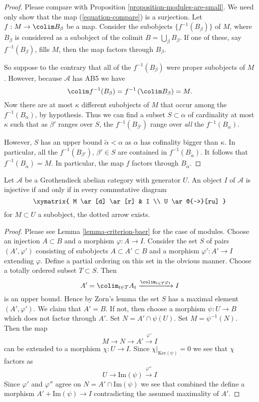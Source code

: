 \begin{proof}
Please compare with Proposition \ref{proposition-modules-are-small}.
We need only show that the map (\ref{equation-compare}) is a surjection.
Let $f : M \to \colim B_\beta$ be a map.
Consider the subobjects $\{f^{-1}(B_\beta)\}$ of $M$, where $B_\beta$
is considered as a subobject of the colimit $B = \bigcup_\beta B_\beta$.
If one of these, say $f^{-1}(B_\beta)$, fills $M$,
then the map factors through $B_\beta$.

\medskip\noindent
So suppose to the contrary that all of the $f^{-1}(B_\beta)$ were proper
subobjects of $M$. However, because $\mathcal{A}$ has
AB5 we have
$$
\colim f^{-1}(B_\beta) = f^{-1}\left(\colim B_\beta\right) = M.
$$
Now there are at most $\kappa$ different subobjects of $M$ that occur among
the $f^{-1}(B_\alpha)$, by hypothesis.
Thus we can find a subset $S \subset \alpha$ of cardinality at most
$\kappa$ such that as $\beta'$ ranges over $S$, the
$f^{-1}(B_{\beta'})$ range over \emph{all} the $f^{-1}(B_\alpha)$.

\medskip\noindent
However, $S$ has an upper bound $\widetilde{\alpha} < \alpha$ as
$\alpha$ has cofinality bigger than $\kappa$. In particular, all the
$f^{-1}(B_{\beta'})$, $\beta' \in S$ are contained in
$f^{-1}(B_{\widetilde{\alpha}})$.
It follows that $f^{-1}(B_{\widetilde{\alpha}}) = M$.
In particular, the map $f$ factors through $B_{\widetilde{\alpha}}$.
\end{proof}

\begin{lemma}
\label{lemma-characterize-injective}
Let $\mathcal{A}$ be a Grothendieck abelian category with generator $U$.
An object $I$ of $\mathcal{A}$ is injective if and only if in every
commutative diagram
$$
\xymatrix{
M \ar[d] \ar[r] &  I \\
U \ar@{-->}[ru]
}
$$
for $M \subset U$ a subobject, the dotted arrow exists.
\end{lemma}

\begin{proof}
Please see Lemma \ref{lemma-criterion-baer} for the case of modules.
Choose an injection $A \subset B$ and a morphism $\varphi : A \to I$.
Consider the set $S$ of pairs $(A', \varphi')$ consisting of
subobjects $A \subset A' \subset B$ and a morphism $\varphi' : A' \to I$
extending $\varphi$. Define a partial ordering on this set in the obvious
manner. Choose a totally ordered subset $T \subset S$. Then
$$
A' = \colim_{t \in T} A_t \xrightarrow{\colim_{t \in T} \varphi_t} I
$$
is an upper bound. Hence by Zorn's lemma the set $S$ has a maximal element
$(A', \varphi')$. We claim that $A' = B$. If not, then choose a morphism
$\psi : U \to B$ which does not factor through $A'$. Set
$N = A' \cap \psi(U)$. Set $M = \psi^{-1}(N)$. Then the map
$$
M \to N \to A' \xrightarrow{\varphi'} I
$$
can be extended to a morphism $\chi : U \to I$. Since
$\chi|_{\text{Ker}(\psi)} = 0$ we see that $\chi$ factors as
$$
U \to \text{Im}(\psi) \xrightarrow{\varphi''} I
$$
Since $\varphi'$ and $\varphi''$ agree on $N = A' \cap \text{Im}(\psi)$
we see that combined the define a morphism $A' + \text{Im}(\psi) \to I$
contradicting the assumed maximality of $A'$.
\end{proof}


